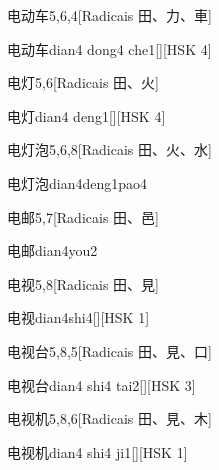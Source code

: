 \begin{entry}{电动车}{5,6,4}[Radicais ⽥、⼒、⾞]
  \begin{phonetics}{电动车}{dian4 dong4 che1}[][HSK 4]
  \end{phonetics}
\end{entry}

\begin{entry}{电灯}{5,6}[Radicais ⽥、⽕]
  \begin{phonetics}{电灯}{dian4 deng1}[][HSK 4]
  \end{phonetics}
\end{entry}

\begin{entry}{电灯泡}{5,6,8}[Radicais ⽥、⽕、⽔]
  \begin{phonetics}{电灯泡}{dian4deng1pao4}
  \end{phonetics}
\end{entry}

\begin{entry}{电邮}{5,7}[Radicais ⽥、⾢]
  \begin{phonetics}{电邮}{dian4you2}
  \end{phonetics}
\end{entry}

\begin{entry}{电视}{5,8}[Radicais ⽥、⾒]
  \begin{phonetics}{电视}{dian4shi4}[][HSK 1]
  \end{phonetics}
\end{entry}

\begin{entry}{电视台}{5,8,5}[Radicais ⽥、⾒、⼝]
  \begin{phonetics}{电视台}{dian4 shi4 tai2}[][HSK 3]
  \end{phonetics}
\end{entry}

\begin{entry}{电视机}{5,8,6}[Radicais ⽥、⾒、⽊]
  \begin{phonetics}{电视机}{dian4 shi4 ji1}[][HSK 1]
  \end{phonetics}
\end{entry}


